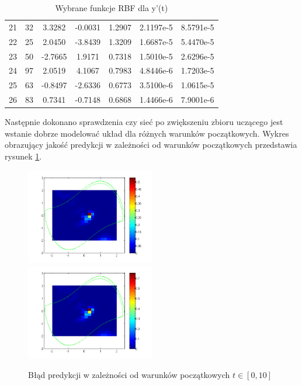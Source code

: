 \begin{table}[ht!]
\begin{tabular}{ |c| c| c| c| c| c| c| }
   21 &  32 &   3.3282  & -0.0031  &  1.2907  &  2.1197e-5 & 8.5791e-5   \\
   22 &  25 &   2.0450  & -3.8439  &  1.3209  &  1.6687e-5 & 5.4470e-5   \\
   23 &  50 &  -2.7665  &  1.9171  &  0.7318  &  1.5010e-5 & 2.6296e-5   \\
   24 &  97 &   2.0519  &  4.1067  &  0.7983  &  4.8446e-6 & 1.7203e-5   \\
   25 &  63 &  -0.8497  & -2.6336  &  0.6773  &  3.5100e-6 & 1.0615e-5   \\
   26 &  83 &   0.7341  & -0.7148  &  0.6868  &  1.4466e-6 & 7.9001e-6   \\
   \hline
\end{tabular}

\caption{Wybrane funkcje RBF dla y'(t)}
\label{tab:rbf_tabela2_x2}
\end{table}

 Następnie dokonano sprawdzenia czy sieć po zwiększeniu zbioru uczącego jest wstanie dobrze modelować układ dla różnych warunków początkowych. Wykres obrazujący jakość predykcji w zależności od warunków początkowych przedstawia rysunek \ref{img:err_initial2}.


\begin{figure}[ht!]
	\centering

	\subfloat
	{\includegraphics[width=0.5\textwidth]
	{images/figure_signal2.png}}
	\subfloat
	{\includegraphics[width=0.5\textwidth]
	{images/figure_deriv2.png}}	
	

	\caption{Błąd predykcji w zależności od warunków początkowych $t \in [0,10]$}
	\label{img:err_initial2}
\end{figure}

